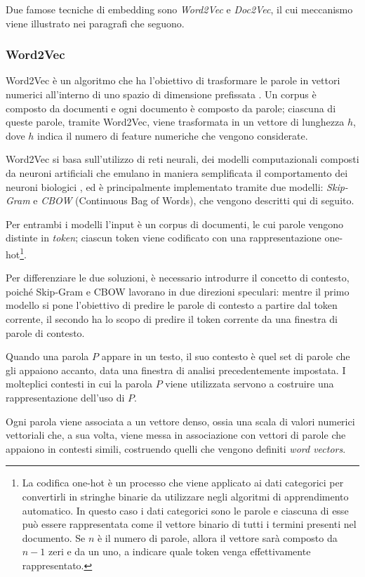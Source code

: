 \documentclass[12pt]{report}
\theoremstyle{definition}
\begin{document}
Due famose tecniche di embedding sono \textit{Word2Vec} e \textit{Doc2Vec}, il cui meccanismo viene illustrato nei paragrafi che seguono.
\subsubsection{Word2Vec} \label{w2v}
Word2Vec è un algoritmo che ha l'obiettivo di trasformare le parole in vettori numerici all'interno di uno spazio  di dimensione prefissata \cite{3}.
Un corpus è composto da documenti e ogni documento è composto da parole; ciascuna di queste parole, tramite Word2Vec, viene trasformata in un vettore di lunghezza $h$, dove $h$ indica il numero di feature numeriche che vengono considerate. 

Word2Vec si basa sull'utilizzo di reti neurali, dei modelli computazionali composti da neuroni artificiali che emulano in maniera semplificata il comportamento dei neuroni biologici \cite{38}, ed è principalmente implementato tramite due modelli: \textit{Skip-Gram} e \textit{CBOW} (Continuous Bag of Words), che vengono descritti qui di seguito.

Per entrambi i modelli l'input è un corpus di documenti, le cui parole vengono distinte in \textit{token}; ciascun token viene codificato con una rappresentazione one-hot\footnote{La codifica one-hot è un processo che viene applicato ai dati categorici per convertirli in stringhe binarie da utilizzare negli algoritmi di apprendimento automatico. In questo caso i dati categorici sono le parole e ciascuna di esse può essere rappresentata come il vettore binario di tutti i termini presenti nel documento. Se $n$ è il numero di parole, allora il vettore sarà composto da $n-1$ zeri e da un uno, a indicare quale token venga effettivamente rappresentato.}.

Per differenziare le due soluzioni, è necessario introdurre il concetto di contesto, poiché Skip-Gram e CBOW lavorano in due direzioni speculari:
mentre il primo modello si pone l'obiettivo di predire le parole di contesto a partire dal token corrente, il secondo ha lo scopo di predire il token corrente da una finestra di parole di contesto.

Quando una parola $P$ appare in un testo, il suo contesto è quel set di parole che gli appaiono accanto, data una finestra di analisi precedentemente impostata. I molteplici contesti in cui la parola $P$ viene utilizzata servono a costruire una rappresentazione dell’uso di $P$.

Ogni parola viene associata a un vettore denso, ossia una scala di valori numerici vettoriali che, a sua volta, viene messa in associazione con vettori di parole che appaiono in contesti simili, costruendo quelli che vengono definiti \textit{word vectors}.
\end{document}

